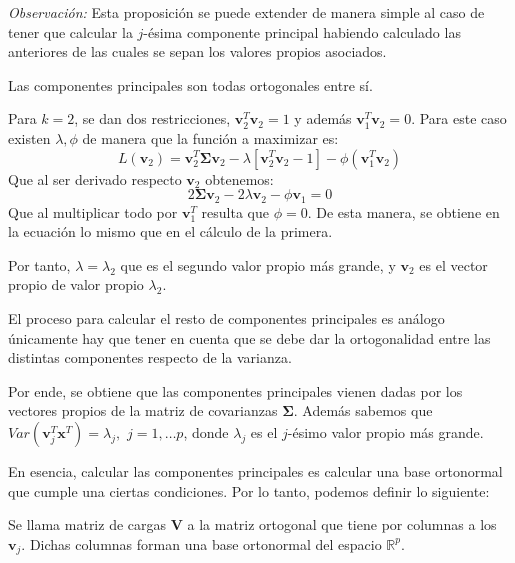 \noindent \emph{Observación: } Esta proposición se puede extender de manera simple al caso de tener que calcular la $j$-ésima componente principal habiendo calculado las anteriores de las cuales se sepan los valores propios asociados. 

\begin{coro}
Las componentes principales son todas ortogonales entre sí. 
\end{coro}

\noindent Para $k=2$, se dan dos restricciones, $\textbf{v}_2^T\textbf{v}_2=1$ y además $\textbf{v}_1^T \textbf{v}_2=0$. Para este caso existen $\lambda, \phi$ de manera que la función a maximizar es:
\begin{equation}
 L(\textbf{v}_2)=\textbf{v}_2^T \mathbf{\Sigma} \textbf{v}_2 - \lambda[\textbf{v}_2^T \textbf{v}_2-1]-\phi(\textbf{v}_1^T \textbf{v}_2)
\end{equation}
Que al ser derivado respecto $\textbf{v}_2$ obtenemos:
\begin{equation}
2\mathbf{\Sigma} \textbf{v}_2 - 2\lambda\textbf{v}_2-\phi \textbf{v}_1=0
\end{equation}
Que al multiplicar todo por $\mathbf{v}_1^T$ resulta que $\phi=0$. De esta manera, se obtiene en la ecuación lo mismo que en el cálculo de la primera. 

\noindent Por tanto, $\lambda=\lambda_2$ que es el segundo valor propio más grande, y $\mathbf{v}_2$ es el vector propio de valor propio $\lambda_2$.

\noindent El proceso para calcular el resto de componentes principales es análogo únicamente hay que tener en cuenta que se debe dar la ortogonalidad entre las distintas componentes respecto de la varianza. 

\noindent Por ende, se obtiene que las componentes principales vienen dadas por los vectores propios de la matriz de covarianzas $\mathbf{\Sigma} $. Además sabemos que $Var(\mathbf{v}_j^T \mathbf{x}^T)=\lambda_j,$ $ j=1,\ldots p$, donde $\lambda_j$ es el $j$-ésimo valor propio más grande. 

\noindent En esencia, calcular las componentes principales es calcular una base ortonormal que cumple una ciertas condiciones. Por lo tanto, podemos definir lo siguiente: 
\begin{defi}
Se llama matriz de cargas $\mathbf{V}$ a la matriz ortogonal que tiene por columnas a los $\mathbf{v}_j$. Dichas columnas forman una base ortonormal del espacio $\mathbb{R}^p$.
\end{defi}

